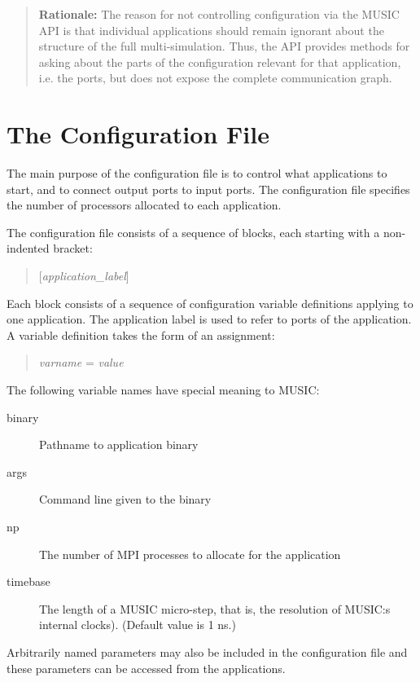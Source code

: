 \documentclass[a4paper]{report}
\newenvironment{rationale}%
{\par\begin{quote}\textbf{Rationale:}}%
{\par\end{quote}}
\begin{document}
\begin{rationale}
  The reason for not controlling configuration via the MUSIC API is
  that individual applications should remain ignorant about the
  structure of the full multi-simulation.  Thus, the API provides
  methods for asking about the parts of the configuration relevant for
  that application, i.e. the ports, but does not expose the complete
  communication graph.
\end{rationale}


\section{The Configuration File}

The main purpose of the configuration file is to control what
applications to start, and to connect output ports to input ports.
The configuration file specifies the number of processors allocated to
each application.

The configuration file consists of a sequence of blocks, each starting
with a non-indented bracket:

\begin{quote}
  [\emph{application\_label}]
\end{quote}

\noindent Each block consists of a sequence of configuration variable
definitions applying to one application.  The application label is
used to refer to ports of the application.  A variable definition
takes the form of an assignment:

\begin{quote}
  \emph{varname} = \emph{value}
\end{quote}

The following variable names have special meaning to MUSIC:
\begin{description}
  \item[binary] Pathname to application binary
  \item[args] Command line given to the binary
  \item[np] The number of MPI processes to allocate for the application
  \item[timebase] The length of a MUSIC micro-step, that is, the
    resolution of MUSIC:s internal clocks).  (Default value is 1 ns.)
\end{description}
Arbitrarily named parameters may also be included in the configuration
file and these parameters can be accessed from the applications.
\end{document}

